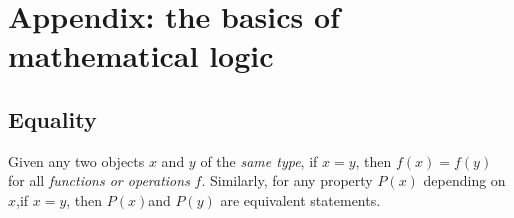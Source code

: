 \renewcommand\thechapter{\Alph{chapter}}
\setcounter{chapter}{0}
\chapter{Appendix: the basics of mathematical logic}\label{ch a}

\setcounter{section}{6}
\section{Equality}\label{section a.7}

\setcounter{axiom}{3}
\begin{axiom}  \label{axm a.7.4}
Given any two objects \(x\) and \(y\) of the \emph{same type}, if \(x = y\), then \(f(x)= f(y)\) for all \emph{functions or operations} \(f\).
Similarly, for any property \(P(x)\) depending on \(x\),if \(x = y\), then \(P(x)\)and \(P(y)\) are equivalent statements.
\end{axiom}